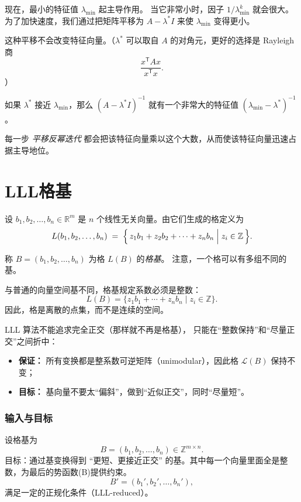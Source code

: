 现在，最小的特征值 $\lambda_{\min}$ 起主导作用。  
当它非常小时，因子 $1/\lambda_{\min}^k$ 就会很大。  
为了加快速度，我们通过把矩阵平移为 $A - \lambda^* I$ 来使 $\lambda_{\min}$ 变得更小。  

这种平移不会改变特征向量。（$\lambda^*$ 可以取自 $A$ 的对角元，更好的选择是 Rayleigh 商 
\[
\frac{x^{\mathsf T} A x}{x^{\mathsf T} x}.
\]）

如果 $\lambda^*$ 接近 $\lambda_{\min}$，那么 $(A - \lambda^* I)^{-1}$ 就有一个非常大的特征值 $(\lambda_{\min} - \lambda^*)^{-1}$。  

每一步 \textit{平移反幂迭代} 都会把该特征向量乘以这个大数，从而使该特征向量迅速占据主导地位。
\chapter{LLL格基}

\begin{definition}[格与格基]
设 $b_1, b_2, \dots, b_n \in \mathbb{R}^m$ 是 $n$ 个线性无关向量。由它们生成的格定义为
\[
L(b_1, b_2, \dots, b_n) \;=\; \Bigl\{\, z_1 b_1 + z_2 b_2 + \cdots + z_n b_n \;\Big|\; z_i \in \mathbb{Z} \,\Bigr\}.
\]

称 $B = (b_1, b_2, \dots, b_n)$ 为格 $L(B)$ 的\emph{格基}。
注意，一个格可以有多组不同的基。
\end{definition}
\begin{remark}
与普通的向量空间基不同，格基规定系数必须是整数：
\[
L(B) = \{ z_1 b_1 + \cdots + z_n b_n \mid z_i \in \mathbb{Z} \}.
\]
因此，格是离散的点集，而不是连续的空间。
\end{remark}
\begin{proposition}
LLL 算法不能追求完全正交（那样就不再是格基），
只能在“整数保持”和“尽量正交”之间折中：
\begin{itemize}
    \item \textbf{保证：} 所有变换都是整系数可逆矩阵（unimodular），因此格 
    \(\mathcal{L}(B)\) 保持不变；
    \item \textbf{目标：} 基向量不要太“偏斜”，做到“近似正交”，同时“尽量短”。
\end{itemize}
\end{proposition}


\subsection*{输入与目标}
设格基为
\[
B = (b_1, b_2, \dots, b_n) \in \mathbb{Z}^{m\times n}.
\]
目标：通过基变换得到 ``更短、更接近正交'' 的基。其中每一个向量里面全是整数，为最后的势函数(B)提供约束。
\[
B' = (b_1', b_2', \dots, b_n'),
\]
满足一定的正规化条件（LLL-reduced）。


